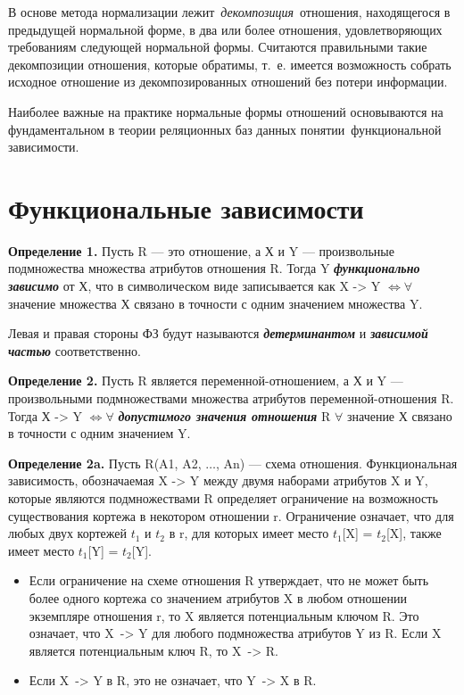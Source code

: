 В основе метода нормализации лежит \textit{декомпозиция} отношения, находящегося в предыдущей нормальной форме, в два или более отношения, удовлетворяющих требованиям следующей нормальной формы. 
Считаются правильными такие декомпозиции отношения, которые обратимы, т.~е. имеется возможность собрать исходное отношение из декомпозированных отношений без потери информации.

Наиболее важные на практике нормальные формы отношений основываются на фундаментальном в теории реляционных баз данных понятии функциональной зависимости.


\section{Функциональные зависимости}

\textbf{Определение 1.} 
Пусть R --- это отношение, а Х и Y --- произвольные подмножества множества атрибутов отношения R. Тогда Y \textit{\bfseries функционально зависимо} от Х, что в символическом виде записывается как X -> Y $\Leftrightarrow \forall$ значение множества Х связано в точности с одним значением множества Y.

Левая и правая стороны ФЗ будут называются \textit{\bfseries детерминантом} и \textit{\bfseries зависимой частью} соответственно.

\textbf{Определение 2.} Пусть R является переменной-отношением, а Х и Y --- произвольными подмножествами множества атрибутов переменной-отношения R. Тогда Х -> Y $\Leftrightarrow \forall$ \textit{\bfseries допустимого значения отношения} R $\forall$ значение Х связано в точности с одним значением Y.

\textbf{Определение 2a.} Пусть R(A1, A2, $\ldots$, An) --- схема отношения. Функциональная зависимость, обозначаемая X -> Y между двумя наборами атрибутов X и Y, которые являются подмножествами R определяет ограничение на возможность существования кортежа в некотором отношении r. Ограничение означает, что для любых двух кортежей $t_1$ и $t_2$ в r, для которых имеет место $t_1$[X] = $t_2$[X], также имеет место $t_1$[Y] = $t_2$[Y].


\begin{itemize}[label*=--]
	\item Если ограничение на схеме отношения R утверждает, что не может быть более одного кортежа со значением атрибутов X в любом отношении экземпляре отношения r, то X является потенциальным ключом R. 
	Это означает, что X -> Y для любого подмножества атрибутов Y из R. 
	Если X является потенциальным ключ R, то X -> R.
	\item Если X -> Y в R, это не означает, что Y -> X в R.
\end{itemize}

